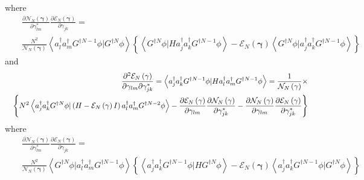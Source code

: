 \documentclass[aps,preprint]{revtex4}
\begin{document}
where%
\begin{eqnarray}
&&\frac{\partial \mathcal{N}_{N}\left( \mathbf{\gamma }\right) }{\partial
\gamma _{lm}^{\ast }}\frac{\partial \mathcal{E}_{N}\left( \mathbf{\gamma }%
\right) }{\partial \gamma _{jk}}=  \nonumber \\
&&\frac{N^{2}}{\mathcal{N}_{N}\left( \mathbf{\gamma }\right) }\left\langle
a_{l}^{\dagger }a_{m}^{\dagger }G^{\dagger N-1}\phi |G^{\dagger N}\phi
\right\rangle \left\{ \left\langle G^{\dagger N}\phi |Ha_{j}^{\dagger
}a_{k}^{\dagger }G^{\dagger N-1}\phi \right\rangle -\mathcal{E}_{N}\left( 
\mathbf{\gamma }\right) \left\langle G^{\dagger N}\phi |a_{j}^{\dagger
}a_{k}^{\dagger }G^{\dagger N-1}\phi \right\rangle \right\}
\end{eqnarray}%
and 
\begin{eqnarray}
&&\frac{\partial ^{2}\mathcal{E}_{N}\left( \mathbf{\gamma }\right) }{%
\partial \gamma _{lm}\partial \gamma _{jk}^{\ast }}=\left\langle
a_{j}^{\dagger }a_{k}^{\dagger }G^{\dagger N-1}\phi |Ha_{l}^{\dagger
}a_{m}^{\dagger }G^{\dagger N-1}\phi \right\rangle =\frac{1}{\mathcal{N}%
_{N}\left( \mathbf{\gamma }\right) }\times  \nonumber \\
&&\left\{ N^{2}\left\langle a_{j}^{\dagger }a_{k}^{\dagger }G^{\dagger
N}\phi |\left( H-\mathcal{E}_{N}\left( \mathbf{\gamma }\right) I\right)
a_{l}^{\dagger }a_{m}^{\dagger }G^{\dagger N-2}\phi \right\rangle -\frac{%
\partial \mathcal{E}_{N}\left( \mathbf{\gamma }\right) }{\partial \gamma
_{lm}}\frac{\partial \mathcal{N}_{N}\left( \mathbf{\gamma }\right) }{%
\partial \gamma _{jk}^{\ast }}-\frac{\partial \mathcal{N}_{N}\left( \mathbf{%
\gamma }\right) }{\partial \gamma _{lm}}\frac{\partial \mathcal{E}_{N}\left( 
\mathbf{\gamma }\right) }{\partial \gamma _{jk}^{\ast }}\right\}
\end{eqnarray}%
where 
\begin{eqnarray}
&&\frac{\partial \mathcal{N}_{N}\left( \mathbf{\gamma }\right) }{\partial
\gamma _{lm}^{\ast }}\frac{\partial \mathcal{E}_{N}\left( \mathbf{\gamma }%
\right) }{\partial \gamma _{jk}}=  \nonumber \\
&&\frac{N^{2}}{\mathcal{N}_{N}\left( \mathbf{\gamma }\right) }\left\langle
G^{\dagger N}\phi |a_{l}^{\dagger }a_{m}^{\dagger }G^{\dagger N-1}\phi
\right\rangle \left\{ \left\langle a_{j}^{\dagger }a_{k}^{\dagger
}G^{\dagger N-1}\phi |HG^{\dagger N}\phi \right\rangle -\mathcal{E}%
_{N}\left( \mathbf{\gamma }\right) \left\langle a_{j}^{\dagger
}a_{k}^{\dagger }G^{\dagger N-1}\phi |G^{\dagger N}\phi \right\rangle
\right\}
\end{eqnarray}%
\end{document}
